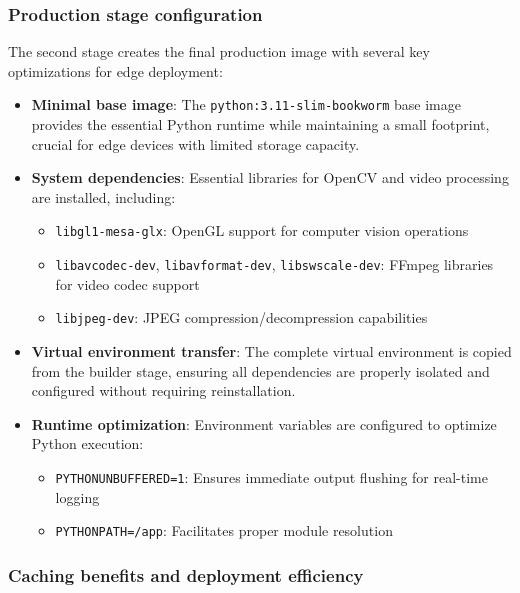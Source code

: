 \subsubsection{Production stage configuration}

The second stage creates the final production image with several key optimizations for edge deployment:

\begin{itemize}
    \item \textbf{Minimal base image}: The \texttt{python:3.11-slim-bookworm} base image provides the essential Python runtime while maintaining a small footprint, crucial for edge devices with limited storage capacity.
    
    \item \textbf{System dependencies}: Essential libraries for OpenCV and video processing are installed, including:
    \begin{itemize}
        \item \texttt{libgl1-mesa-glx}: OpenGL support for computer vision operations
        \item \texttt{libavcodec-dev}, \texttt{libavformat-dev}, \texttt{libswscale-dev}: FFmpeg libraries for video codec support
        \item \texttt{libjpeg-dev}: JPEG compression/decompression capabilities
    \end{itemize}
    
    \item \textbf{Virtual environment transfer}: The complete virtual environment is copied from the builder stage, ensuring all dependencies are properly isolated and configured without requiring reinstallation.
    
    \item \textbf{Runtime optimization}: Environment variables are configured to optimize Python execution:
    \begin{itemize}
        \item \texttt{PYTHONUNBUFFERED=1}: Ensures immediate output flushing for real-time logging
        \item \texttt{PYTHONPATH=/app}: Facilitates proper module resolution
    \end{itemize}
\end{itemize}

\subsubsection{Caching benefits and deployment efficiency}

